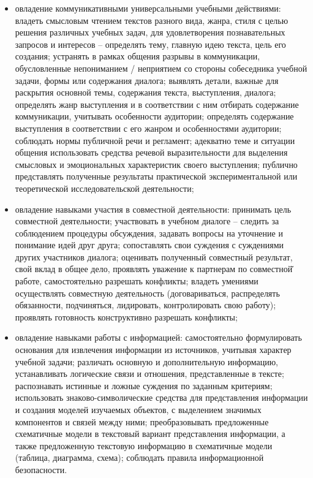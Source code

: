 \documentclass[
  11pt,
  russian,
]{book}
\begin{document}
\begin{itemize}
\item
  овладение коммуникативными универсальными учебными действиями: владеть смысловым чтением текстов разного вида, жанра, стиля с целью решения различных учебных задач, для удовлетворения познавательных запросов и интересов -- определять тему, главную идею текста, цель его создания; устранять в рамках общения разрывы в коммуникации, обусловленные непониманием / неприятием со стороны собеседника учебной задачи, формы или содержания диалога; выявлять детали, важные для раскрытия основной темы, содержания текста, выступления, диалога; определять жанр выступления и в соответствии с ним отбирать содержание коммуникации, учитывать особенности аудитории; определять содержание выступления в соответствии с его жанром и особенностями аудитории; соблюдать нормы публичной речи и регламент; адекватно теме и ситуации общения использовать средства речевой выразительности для выделения смысловых и эмоциональных характеристик своего выступления; публично представлять полученные результаты практической экспериментальной или теоретической исследовательской деятельности;
\item
  овладение навыками участия в совместной деятельности: принимать цель совместной деятельности; участвовать в учебном диалоге -- следить за соблюдением процедуры обсуждения, задавать вопросы на уточнение и понимание идей друг друга; сопоставлять свои суждения с суждениями других участников диалога; оценивать полученный совместный результат, свой вклад в общее дело, проявлять уважение к партнерам по совместной̆ работе, самостоятельно разрешать конфликты; владеть умениями осуществлять совместную деятельность (договариваться, распределять обязанности, подчиняться, лидировать, контролировать свою работу); проявлять готовность конструктивно разрешать конфликты;
\item
  овладение навыками работы с информацией: самостоятельно формулировать основания для извлечения информации из источников, учитывая характер учебной задачи; различать основную и дополнительную информацию, устанавливать логические связи и отношения, представленные в тексте; распознавать истинные и ложные суждения по заданным критериям; использовать знаково-символические средства для представления информации и создания моделей изучаемых объектов, с выделением значимых компонентов и связей между ними; преобразовывать предложенные схематичные модели в текстовый вариант представления информации, а также предложенную текстовую информацию в схематичные модели (таблица, диаграмма, схема); соблюдать правила информационной безопасности.
\end{itemize}
\end{document}
